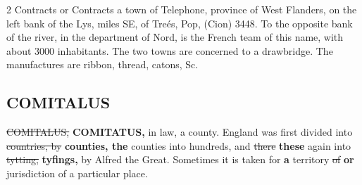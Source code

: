 \documentclass[10pt]{article}
\begin{document}
\begin{multicols}{2}
Contracts or Contracts a town of Telephone, province of West Flanders, on the left bank of the Lys, miles SE, of Treés, Pop, (Cion) 3448. To the opposite bank of the river, in the department of Nord, is the French team of this name, with about 3000 inhabitants. The two towns are concerned to a drawbridge. The manufactures are ribbon, thread, catons, Sc.

\subsection*{COMITALUS}
\sout{COMITALUS,} \textbf{COMITATUS,} in law, a county. England was first divided into \sout{countries, by} \textbf{counties, the} counties into hundreds, and \sout{there} \textbf{these} again into \sout{tytting,} \textbf{tyfings,} by Alfred the Great. Sometimes it is taken for \textbf{a} territory \sout{of} \textbf{or} jurisdiction of a particular place.


\end{multicols}
\end{document}
